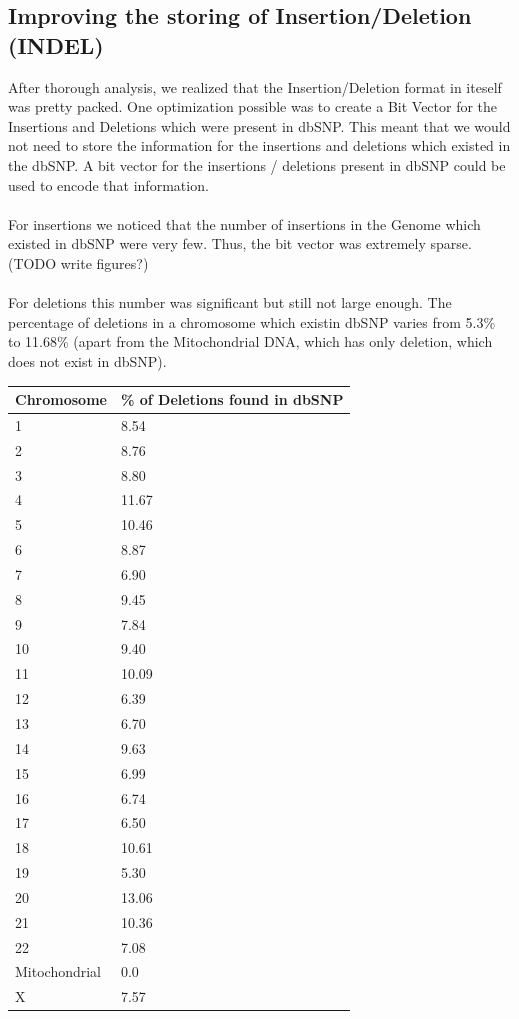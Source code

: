 \documentclass{article}
\begin{document}
\subsection {Improving the storing of Insertion/Deletion (INDEL)}
After thorough analysis, we realized that the Insertion/Deletion format in iteself was pretty packed. One optimization possible was to create a Bit Vector for the Insertions and Deletions which were present in dbSNP. This meant that we would not need to store the information for the insertions and deletions which existed in the dbSNP. A bit vector for the insertions / deletions present in dbSNP could be used to encode that information.\\ 
\\
For insertions we noticed that the number of insertions in the Genome which existed in dbSNP were very few. Thus, the bit vector was extremely sparse. (TODO write figures?) \\
\\
For deletions this number was significant but still not large enough. The percentage of deletions in a chromosome which existin dbSNP varies from 5.3\% to 11.68\% (apart from the Mitochondrial DNA, which has only deletion, which does not exist in dbSNP).

\begin{center}
	\begin{tabular}{|p{1in}|p{1in}|}
	\hline
	Chromosome	&		\% of Deletions found in dbSNP \\
	\hline
	1	&		8.54 \\
	\hline
	2	&		8.76 \\
	\hline
	3	&		8.80 \\
	\hline
	4	&	11.67 \\
	\hline
	5	&	10.46 \\
	\hline
	6	&	8.87 \\
	\hline
	7	&	6.90 \\
	\hline
	8	&	9.45 \\
	\hline
	9	&	7.84 \\
	\hline
	10	&	9.40 \\
	\hline
	11	&	10.09 \\
	\hline
	12	&	6.39 \\
	\hline
	13	&	6.70 \\
	\hline
	14	&	9.63 \\
	\hline
	15	&	6.99 \\
	\hline
	16	&	6.74 \\	
	\hline
	17	&	6.50 \\
	\hline	
	18	&	10.61 \\
	\hline	
	19	&	5.30 \\
	\hline
	20	&	13.06 \\	
	\hline
	21	&	10.36 \\
	\hline
	22	&	7.08  \\
	\hline
	Mitochondrial	&	0.0 \\
	\hline
	X	&	7.57 \\
	\hline
	\end{tabular}

\end{center}
\end{document}
